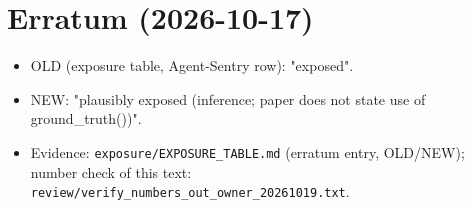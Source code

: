 \documentclass[11pt]{article}
\providecommand{\tightlist}{\setlength{\itemsep}{0pt}\setlength{\parskip}{0pt}}
\begin{document}
\section{Erratum (2026-10-17)}\label{erratum-2026-10-17}

\begin{itemize}
\tightlist
\item
  OLD (exposure table, Agent-Sentry row): "exposed".
\item
  NEW: "plausibly exposed (inference; paper does not state use of ground\_truth())".
\item
  Evidence: \texttt{exposure/\allowbreak{}EXPOSURE\_\allowbreak{}TABLE.md} (erratum entry, OLD/NEW); number check of this text: \texttt{review/\allowbreak{}verify\_\allowbreak{}numbers\_\allowbreak{}out\_\allowbreak{}owner\_\allowbreak{}20261019.txt}.
\end{itemize}
\end{document}
